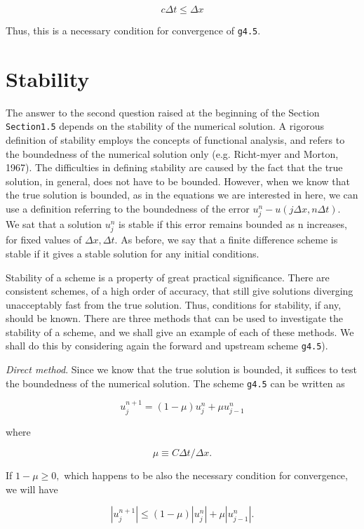     \[c\Delta t \leq \Delta x\]

Thus, this is a necessary condition for convergence of \texttt{g4.5}.

\section{Stability}\label{sec:stability}

The answer to the second question raised at the beginning of the
Section \texttt{Section1.5} depends on the stability of the numerical
solution. A rigorous definition of stability employs the concepts of
functional analysis, and refers to the boundedness of the numerical
solution only (e.g. Richt-myer and Morton, 1967). The difficulties in
defining stability are caused by the fact that the true solution, in
general, does not have to be bounded. However, when we know that the
true solution is bounded, as in the equations we are interested in here,
we can use a definition referring to the boundedness of the error
\(u_{j}^{n} - u\left( j\Delta x,n\Delta t \right)\text{. }\) We sat that
a solution \(u_{j}^{n}\) is stable if this error remains bounded as n
increases, for fixed values of \(\Delta x,\Delta t.\) As before, we say
that a finite difference scheme is stable if it gives a stable solution
for any initial conditions.

Stability of a scheme is a property of great practical significance.
There are consistent schemes, of a high order of accuracy, that still
give solutions diverging unacceptably fast from the true solution. Thus,
conditions for stability, if any, should be known. There are three
methods that can be used to investigate the stability of a scheme, and
we shall give an example of each of these methods. We shall do this by
considering again the forward and upstream scheme \texttt{g4.5}).

\emph{Direct method}. Since we know that the true solution is bounded,
it suffices to test the boundedness of the numerical solution. The
scheme \texttt{g4.5} can be written as

    \[u_{j}^{n + 1} = \left( 1 - \mu \right)u_{j}^{n}+ \mu u_{j - 1}^{n}\]

where

\[\mu \equiv C\Delta t/\Delta x.\]

If \(1 - \mu \geq 0,\) which happens to be also the necessary condition
for convergence, we will have

    \[\left| u_{j}^{n + 1} \right| \leq \left( 1 - \mu \right)\left| u_{j}^{n} \right| + \mu\left| u_{j - 1}^{n} \right|.\]

